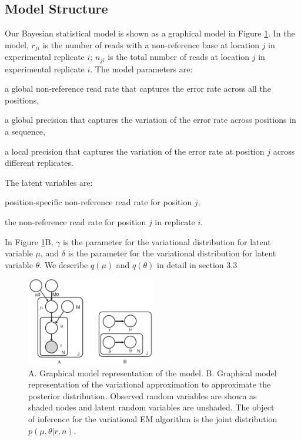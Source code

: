 \documentclass{bmcart}
\begin{document}
\subsection*{Model Structure}
Our Bayesian statistical model is shown as a graphical model in Figure \ref{figure:model}.
In the model, $r_{ji}$ is the number of reads with a non-reference base at location $j$ in experimental replicate $i$; $n_{ji}$ is the total number of reads at location $j$ in experimental replicate $i$.
The model parameters are:
\begin{description}[noitemsep]
  \item[$\mu_0$] a global non-reference read rate that captures the error rate across all the positions,
  \item[$M_0$] a global precision that captures the variation of the error rate across positions in a sequence,
  \item[$M_j$] a local precision that captures the variation of the error rate at position $j$ across different replicates.
\end{description}
The latent variables are:
\begin{description}[noitemsep]
  \item[$\mu_j \sim \text{Beta}(\mu_0, M_0)$] position-specific non-reference read rate for position $j$,
  \item[$\theta_{ji} \sim \text{Beta}(\mu_j, M_j)$] the non-reference read rate for position $j$ in replicate $i$.
\end{description}

In Figure \ref{figure:model}B, $\gamma$ is the parameter for the variational distribution for latent variable $\mu$,
and $\delta$ is the parameter for the variational distribution for latent variable $\theta$.
We describe $q(\mu)$ and $q(\theta)$ in detail in section 3.3

\begin{figure}[htpb]

\begin{center}
\includegraphics[width=0.5\textwidth]{rvd3.png}
\caption{ A. Graphical model representation of the model.
B. Graphical model representation of the variational approximation  to approximate the posterior distribution.
Observed random variables are shown as shaded nodes and latent random variables are unshaded.
The object of inference for the variational EM algorithm is the joint distribution $p(\mu, \theta|r, n)$.}
\label{figure:model}
\end{center}
\end{figure}
\end{document}
